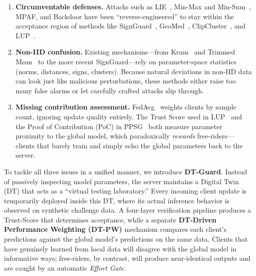 \documentclass[conference]{IEEEtran}
\begin{document}
    \begin{enumerate}
        \item \textbf{Circumventable defenses.} Attacks such as LIE~\cite{baruch2019little}, Min-Max and Min-Sum~\cite{shejwalkar2021manipulating}, MPAF, and Backdoor have been ``reverse-engineered'' to stay within the acceptance region of methods like SignGuard~\cite{xu2022signguard}, GeoMed~\cite{pillutla2022robust}, ClipCluster~\cite{zeng2024clipcluster}, and LUP~\cite{issa2025dtbfl}.
    
        \item \textbf{Non-IID confusion.} Existing mechanisms---from Krum~\cite{blanchard2017machine} and Trimmed Mean~\cite{yin2018byzantine} to the more recent SignGuard---rely on parameter-space statistics (norms, distances, signs, clusters). Because natural deviations in non-IID data can look just like malicious perturbations, these methods either raise too many false alarms or let carefully crafted attacks slip through.
    
        \item \textbf{Missing contribution assessment.} FedAvg~\cite{mcmahan2016communication} weights clients by sample count, ignoring update quality entirely. The Trust Score used in LUP~\cite{issa2025dtbfl} and the Proof of Contribution (PoC) in PPSG~\cite{zhang2025ppsg} both measure parameter proximity to the global model, which paradoxically \emph{rewards} free-riders---clients that barely train and simply echo the global parameters back to the server.
    \end{enumerate}
    
    To tackle all three issues in a unified manner, we introduce \textbf{DT-Guard}. Instead of passively inspecting model parameters, the server maintains a Digital Twin (DT) that acts as a ``virtual testing laboratory.'' Every incoming client update is temporarily deployed inside this DT, where its actual inference behavior is observed on synthetic challenge data. A four-layer verification pipeline produces a Trust-Score that determines acceptance, while a separate \textbf{DT-Driven Performance Weighting (DT-PW)} mechanism compares each client's predictions against the global model's predictions on the same data. Clients that have genuinely learned from local data will disagree with the global model in informative ways; free-riders, by contrast, will produce near-identical outputs and are caught by an automatic \emph{Effort Gate}.
    
\end{document}
